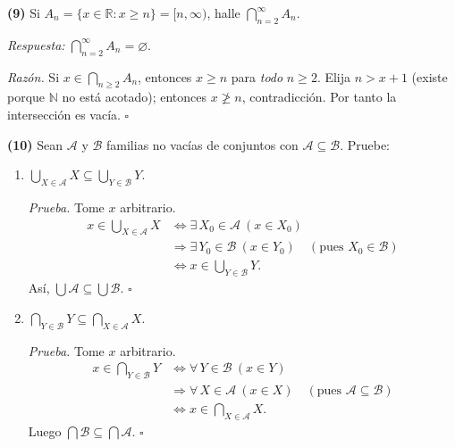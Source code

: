 \documentclass[12pt,letterpaper]{exam}
\begin{document}
\begin{questions}
\question \textbf{(9)} Si $A_n=\{x\in\mathbb R:x\ge n\}=[n,\infty)$, halle 
\(
\displaystyle\bigcap_{n=2}^{\infty}A_n.
\)

\textit{Respuesta:} \(
\displaystyle\bigcap_{n=2}^{\infty}A_n=\varnothing.
\)

\textit{Razón.} Si $x\in\bigcap_{n\ge2}A_n$, entonces $x\ge n$ para \emph{todo} $n\ge2$. Elija $n>x+1$ (existe porque $\mathbb N$ no está acotado); entonces $x\not\ge n$, contradicción. Por tanto la intersección es vacía.
\hfill$\square$

\question \textbf{(10)} Sean $\mathcal A$ y $\mathcal B$ familias no vacías de conjuntos con $\mathcal A\subseteq\mathcal B$. Pruebe:

\begin{enumerate}[label=\alph*)]
\item \(\displaystyle \bigcup_{X\in\mathcal A} X \subseteq \bigcup_{Y\in\mathcal B} Y.\)

\textit{Prueba.} Tome $x$ arbitrario.
\[
\begin{aligned}
x\in \bigcup_{X\in\mathcal A}X 
&\Leftrightarrow \exists\,X_0\in\mathcal A\ (x\in X_0)\\
&\Rightarrow \exists\,Y_0\in\mathcal B\ (x\in Y_0)\quad(\text{pues }X_0\in\mathcal B)\\
&\Leftrightarrow x\in \bigcup_{Y\in\mathcal B}Y.
\end{aligned}
\]
Así, $\bigcup\mathcal A\subseteq\bigcup\mathcal B$.
\hfill$\square$

\item \(\displaystyle \bigcap_{Y\in\mathcal B} Y \subseteq \bigcap_{X\in\mathcal A} X.\)

\textit{Prueba.} Tome $x$ arbitrario.
\[
\begin{aligned}
x\in \bigcap_{Y\in\mathcal B}Y
&\Leftrightarrow \forall\,Y\in\mathcal B\ (x\in Y)\\
&\Rightarrow \forall\,X\in\mathcal A\ (x\in X)\quad(\text{pues }\mathcal A\subseteq\mathcal B)\\
&\Leftrightarrow x\in \bigcap_{X\in\mathcal A}X.
\end{aligned}
\]
Luego $\bigcap\mathcal B\subseteq\bigcap\mathcal A$.
\hfill$\square$
\end{enumerate}
\end{questions}
\end{document}
